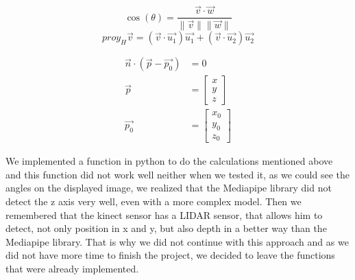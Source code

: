 \documentclass[conference]{IEEEtran}
\begin{document}
\begin{equation}\label{eq:angle}
    \cos(\theta) = \frac{\vec{v} \cdot \vec{w}}{\| \vec{v} \| \| \vec{w} \|}
\end{equation}
\begin{equation}\label{eq:proy}
    proy_H \vec{v} = \left( \vec{v} \cdot \vec{u_1} \right) \vec{u_1} + \left( \vec{v} \cdot \vec{u_2} \right) \vec{u_2}
\end{equation}


 \begin{subequations}
    \begin{align}
        \vec{n} \cdot (\vec{p} - \vec{p_0}) &= 0 \label{eq:plano} \\
        \vec{p} &= \begin{bmatrix}
        x \\
        y \\
        z
        \end{bmatrix} \label{eq:p} \\
        \vec{p_0} &= \begin{bmatrix}
        x_0 \\
        y_0 \\
        z_0
        \end{bmatrix} \label{eq:p0}
    \end{align}
 \end{subequations}

We implemented a function in python to do the calculations mentioned above and this function did not work well neither when we tested it, as we could see the angles on the displayed image, we realized that the Mediapipe library did not detect the z axis very well, even with a more complex model. Then we remembered that the kinect sensor has a LIDAR sensor, that allows him to detect, not only position in x and y, but also depth in a better way than the Mediapipe library. 
That is why we did not continue with this approach and as we did not have more time to finish the project, we decided to leave the functions that were already implemented.

\end{document}
